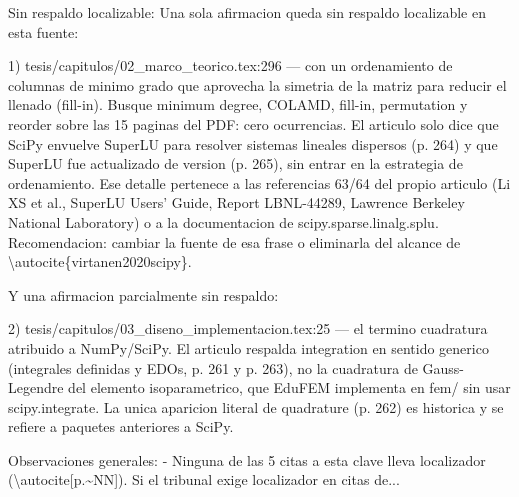 \documentclass[11pt,a4paper]{article}
\newcommand{\campo}[1]{\textcolor{gris}{\footnotesize #1}}
\begin{document}
{\small\campo{Sin respaldo localizable:} Una sola afirmacion queda sin respaldo localizable en esta fuente:

1) tesis/capitulos/02\_marco\_teorico.tex:296 --- \textquotedbl{}con un ordenamiento de columnas de minimo grado que aprovecha la simetria de la matriz para reducir el llenado (fill-in)\textquotedbl{}. Busque \textquotedbl{}minimum degree\textquotedbl{}, \textquotedbl{}COLAMD\textquotedbl{}, \textquotedbl{}fill-in\textquotedbl{}, \textquotedbl{}permutation\textquotedbl{} y \textquotedbl{}reorder\textquotedbl{} sobre las 15 paginas del PDF: cero ocurrencias. El articulo solo dice que SciPy envuelve SuperLU para resolver sistemas lineales dispersos (p. 264) y que SuperLU fue actualizado de version (p. 265), sin entrar en la estrategia de ordenamiento. Ese detalle pertenece a las referencias 63/64 del propio articulo (Li XS et al., SuperLU Users' Guide, Report LBNL-44289, Lawrence Berkeley National Laboratory) o a la documentacion de scipy.sparse.linalg.splu. Recomendacion: cambiar la fuente de esa frase o eliminarla del alcance de \textbackslash{}autocite\{virtanen2020scipy\}.

Y una afirmacion parcialmente sin respaldo:

2) tesis/capitulos/03\_diseno\_implementacion.tex:25 --- el termino \textquotedbl{}cuadratura\textquotedbl{} atribuido a NumPy/SciPy. El articulo respalda \textquotedbl{}integration\textquotedbl{} en sentido generico (integrales definidas y EDOs, p. 261 y p. 263), no la cuadratura de Gauss-Legendre del elemento isoparametrico, que EduFEM implementa en fem/ sin usar scipy.integrate. La unica aparicion literal de \textquotedbl{}quadrature\textquotedbl{} (p. 262) es historica y se refiere a paquetes anteriores a SciPy.

Observaciones generales:
- Ninguna de las 5 citas a esta clave lleva localizador (\textbackslash{}autocite[p.\textasciitilde{}NN]). Si el tribunal exige localizador en citas de...\par}
\end{document}
